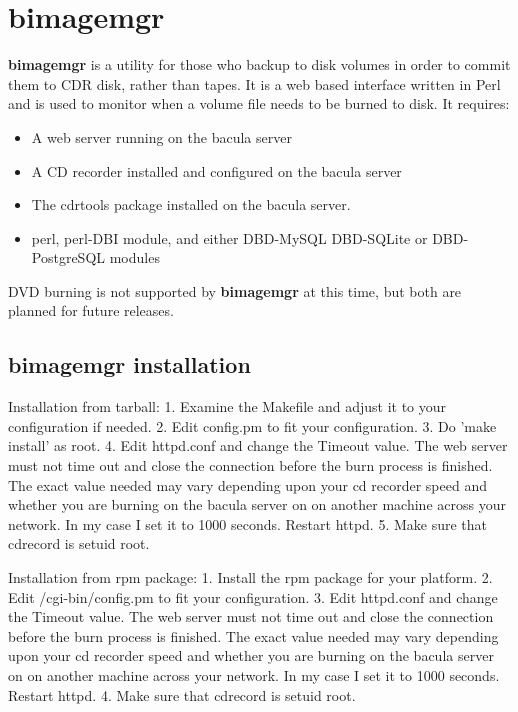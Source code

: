 
\section{bimagemgr}
\label{bimagemgr}

{\bf bimagemgr} is a utility for those who backup to disk volumes in order to
commit them to CDR disk, rather than tapes. It is a web based interface
written in Perl and is used to monitor when a volume file needs to be burned to
disk. It requires: 

\begin{itemize}
\item A web server running on the bacula server 
\item A CD recorder installed and configured on the bacula server 
\item The cdrtools package installed on the bacula server. 
\item perl, perl-DBI module, and either DBD-MySQL DBD-SQLite or DBD-PostgreSQL modules 
   \end{itemize}

DVD burning is not supported by {\bf bimagemgr} at this
time, but both are planned for future releases. 

\subsection{bimagemgr installation}

Installation from tarball:
1. Examine the Makefile and adjust it to your configuration if needed.
2. Edit config.pm to fit your configuration.
3. Do 'make install' as root.
4. Edit httpd.conf and change the Timeout value. The web server must not time
out and close the connection before the burn process is finished. The exact
value needed may vary depending upon your cd recorder speed and whether you are
burning on the bacula server on on another machine across your network. In my 
case I set it to 1000 seconds. Restart httpd.
5. Make sure that cdrecord is setuid root.

Installation from rpm package:
1. Install the rpm package for your platform.
2. Edit /cgi-bin/config.pm to fit your configuration.
3. Edit httpd.conf and change the Timeout value. The web server must not time
out and close the connection before the burn process is finished. The exact
value needed may vary depending upon your cd recorder speed and whether you are
burning on the bacula server on on another machine across your network. In my 
case I set it to 1000 seconds. Restart httpd.
4. Make sure that cdrecord is setuid root.

